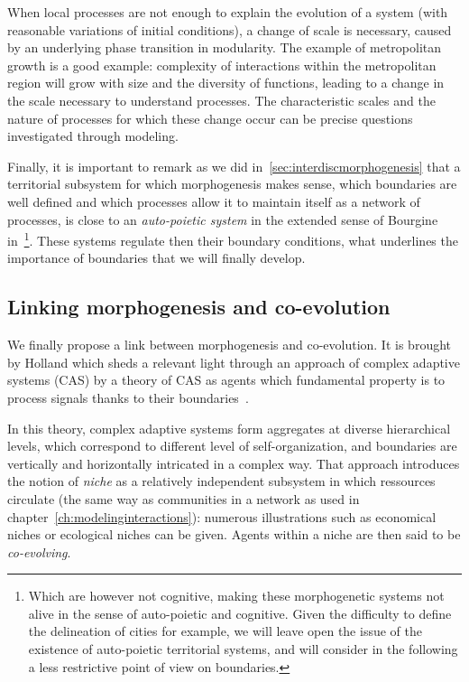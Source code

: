 \documentclass[letterpaper]{article}
\begin{document}
When local processes are not enough to explain the evolution of a system (with reasonable variations of initial conditions), a change of scale is necessary, caused by an underlying phase transition in modularity. The example of metropolitan growth is a good example: complexity of interactions within the metropolitan region will grow with size and the diversity of functions, leading to a change in the scale necessary to understand processes. The characteristic scales and the nature of processes for which these change occur can be precise questions investigated through modeling.

Finally, it is important to remark as we did in~\ref{sec:interdiscmorphogenesis} that a territorial subsystem for which morphogenesis makes sense, which boundaries are well defined and which processes allow it to maintain itself as a network of processes, is close to an \emph{auto-poietic system} in the extended sense of Bourgine in~\cite{bourgine2004autopoiesis}\footnote{Which are however not cognitive, making these morphogenetic systems not alive in the sense of auto-poietic and cognitive. Given the difficulty to define the delineation of cities for example, we will leave open the issue of the existence of auto-poietic territorial systems, and will consider in the following a less restrictive point of view on boundaries.}. These systems regulate then their boundary conditions, what underlines the importance of boundaries that we will finally develop.


\subsection{Linking morphogenesis and co-evolution}


We finally propose a link between morphogenesis and co-evolution. It is brought by Holland which sheds a relevant light through an approach of complex adaptive systems (CAS) by a theory of CAS as agents which fundamental property is to process signals thanks to their boundaries~\cite{holland2012signals}.


In this theory, complex adaptive systems form aggregates at diverse hierarchical levels, which correspond to different level of self-organization, and boundaries are vertically and horizontally intricated in a complex way. That approach introduces the notion of \emph{niche} as a relatively independent subsystem in which ressources circulate (the same way as communities in a network as used in chapter~\ref{ch:modelinginteractions}): numerous illustrations such as economical niches or ecological niches can be given. Agents within a niche are then said to be \emph{co-evolving}.
\end{document}
